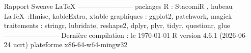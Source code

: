 \documentclass[11pt,twoside]{article}\usepackage[]{graphicx}\usepackage[table]{xcolor}
\def\\{}%
\begin{document}
% 
% 

\clearpage

\begin{singlespace}


\normalsize
\null
\vfill

Rapport Sweave \LaTeX \\
------------------------\\
packages R : \vspace{1mm}
StacomiR \citep{legrand_stacomir_2019}, hubeau\\
\LaTeX \ :Hmisc, kableExtra, xtable\\
graphiques : ggplot2, patchwork, magick\\
traitements : stringr, lubridate, reshape2, dplyr, plyr, tidyr, questionr, glue\\
------------------------\\
Dernière compilation : le \today \\
 R version 4.6.1 (2026-06-24 ucrt)\\
 plateforme x86-64-w64-mingw32

\clearpage
\end{singlespace}
\end{document}
